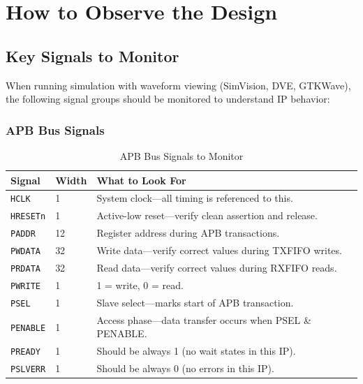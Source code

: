 \chapter{How to Observe the Design}
\label{ch:observation}

\section{Key Signals to Monitor}

When running simulation with waveform viewing (SimVision, DVE, GTKWave), the following signal
groups should be monitored to understand IP behavior:

\subsection{APB Bus Signals}

\begin{table}[H]
\centering
\caption{APB Bus Signals to Monitor}
\label{tab:apb_signals}
\begin{tabularx}{\textwidth}{@{}llX@{}}
\toprule
\textbf{Signal} & \textbf{Width} & \textbf{What to Look For} \\
\midrule
\texttt{HCLK}     & 1  & System clock---all timing is referenced to this. \\
\texttt{HRESETn}  & 1  & Active-low reset---verify clean assertion and release. \\
\texttt{PADDR}    & 12 & Register address during APB transactions. \\
\texttt{PWDATA}   & 32 & Write data---verify correct values during TXFIFO writes. \\
\texttt{PRDATA}   & 32 & Read data---verify correct values during RXFIFO reads. \\
\texttt{PWRITE}   & 1  & 1 = write, 0 = read. \\
\texttt{PSEL}     & 1  & Slave select---marks start of APB transaction. \\
\texttt{PENABLE}  & 1  & Access phase---data transfer occurs when PSEL \& PENABLE. \\
\texttt{PREADY}   & 1  & Should be always 1 (no wait states in this IP). \\
\texttt{PSLVERR}  & 1  & Should be always 0 (no errors in this IP). \\
\bottomrule
\end{tabularx}
\end{table}


